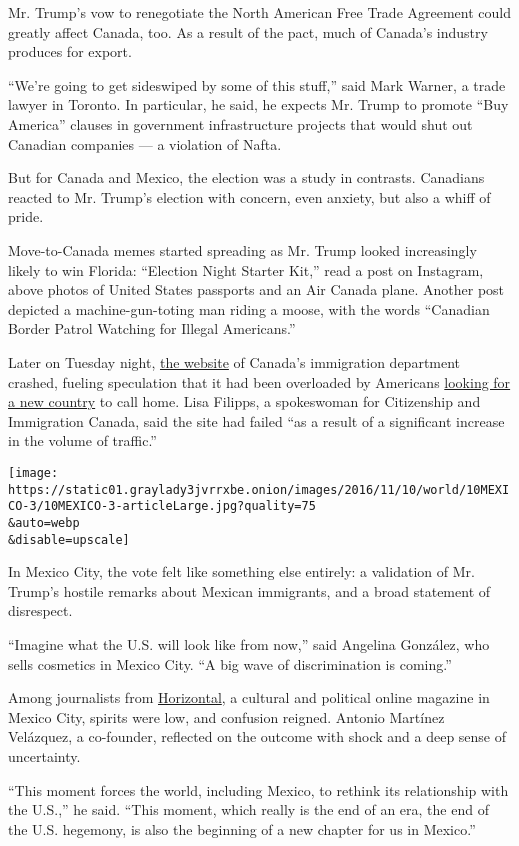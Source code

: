Mr. Trump's vow to renegotiate the North American Free Trade Agreement
could greatly affect Canada, too. As a result of the pact, much of
Canada's industry produces for export.

``We're going to get sideswiped by some of this stuff,'' said Mark
Warner, a trade lawyer in Toronto. In particular, he said, he expects
Mr. Trump to promote ``Buy America'' clauses in government
infrastructure projects that would shut out Canadian companies --- a
violation of Nafta.

But for Canada and Mexico, the election was a study in contrasts.
Canadians reacted to Mr. Trump's election with concern, even anxiety,
but also a whiff of pride.

Move-to-Canada memes started spreading as Mr. Trump looked increasingly
likely to win Florida: ``Election Night Starter Kit,'' read a post on
Instagram, above photos of United States passports and an Air Canada
plane. Another post depicted a machine-gun-toting man riding a moose,
with the words ``Canadian Border Patrol Watching for Illegal
Americans.''

Later on Tuesday night, \href{http://www.cic.gc.ca/}{the website} of
Canada's immigration department crashed, fueling speculation that it had
been overloaded by Americans
\href{http://www.nytimes3xbfgragh.onion/2016/11/10/us/-canada-immigration.html?src=twr}{looking
for a new country} to call home. Lisa Filipps, a spokeswoman for
Citizenship and Immigration Canada, said the site had failed ``as a
result of a significant increase in the volume of traffic.''

\texttt{[image: https://static01.graylady3jvrrxbe.onion/images/2016/11/10/world/10MEXICO-3/10MEXICO-3-articleLarge.jpg?quality=75\\\&auto=webp\\\&disable=upscale]}

In Mexico City, the vote felt like something else entirely: a validation
of Mr. Trump's hostile remarks about Mexican immigrants, and a broad
statement of disrespect.

``Imagine what the U.S. will look like from now,'' said Angelina
González, who sells cosmetics in Mexico City. ``A big wave of
discrimination is coming.''

Among journalists from \href{http://horizontal.mx/}{Horizontal}, a
cultural and political online magazine in Mexico City, spirits were low,
and confusion reigned. Antonio Martínez Velázquez, a co-founder,
reflected on the outcome with shock and a deep sense of uncertainty.

``This moment forces the world, including Mexico, to rethink its
relationship with the U.S.,'' he said. ``This moment, which really is
the end of an era, the end of the U.S. hegemony, is also the beginning
of a new chapter for us in Mexico.''

